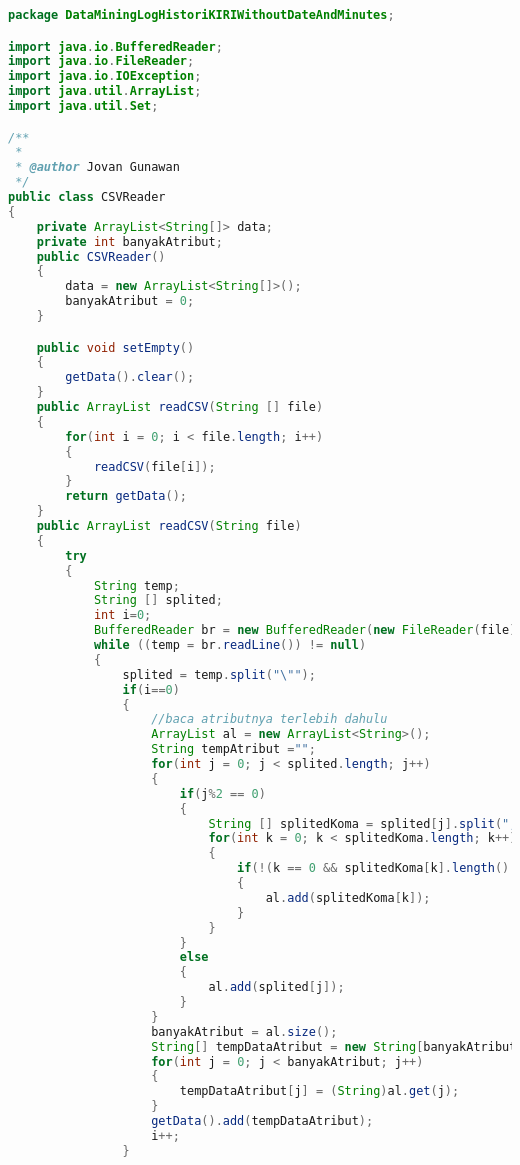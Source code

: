 \begin{lstlisting}[language=Java,basicstyle=\tiny,caption=CSVReader.java]
package DataMiningLogHistoriKIRIWithoutDateAndMinutes;

import java.io.BufferedReader;
import java.io.FileReader;
import java.io.IOException;
import java.util.ArrayList;
import java.util.Set;

/**
 *
 * @author Jovan Gunawan
 */
public class CSVReader
{
    private ArrayList<String[]> data;
    private int banyakAtribut;
    public CSVReader() 
    {
        data = new ArrayList<String[]>();
        banyakAtribut = 0;
    }

    public void setEmpty()
    {
        getData().clear();
    }
    public ArrayList readCSV(String [] file)
    {
        for(int i = 0; i < file.length; i++)
        {
            readCSV(file[i]);
        }
        return getData();
    }
    public ArrayList readCSV(String file)
    {
        try
        {
            String temp;
            String [] splited;
            int i=0;
            BufferedReader br = new BufferedReader(new FileReader(file));
            while ((temp = br.readLine()) != null)
            {
                splited = temp.split("\"");
                if(i==0)
                {
                    //baca atributnya terlebih dahulu
                    ArrayList al = new ArrayList<String>();
                    String tempAtribut ="";
                    for(int j = 0; j < splited.length; j++)
                    {
                        if(j%2 == 0)
                        {
                            String [] splitedKoma = splited[j].split(",");
                            for(int k = 0; k < splitedKoma.length; k++)
                            {
                                if(!(k == 0 && splitedKoma[k].length() ==0)||(k==splitedKoma.length-1 && splitedKoma[k].length() == 0))
                                {
                                    al.add(splitedKoma[k]);
                                }
                            }
                        }
                        else
                        {
                            al.add(splited[j]);
                        }
                    }
                    banyakAtribut = al.size();
                    String[] tempDataAtribut = new String[banyakAtribut];
                    for(int j = 0; j < banyakAtribut; j++)
                    {
                        tempDataAtribut[j] = (String)al.get(j);
                    }
                    getData().add(tempDataAtribut);
                    i++;
                }

\end{lstlisting}
